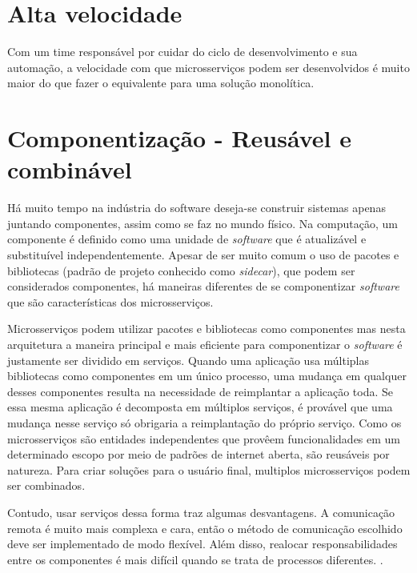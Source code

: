 \section{Alta velocidade}

Com um time responsável por cuidar do ciclo de desenvolvimento e sua automação, a velocidade com que microsserviços podem ser desenvolvidos é muito maior do que fazer o equivalente para uma solução monolítica. \cite{Familiar2015}

\section{Componentização - Reusável e combinável}

Há muito tempo na indústria do software deseja-se construir sistemas apenas juntando componentes, assim como se faz no mundo físico. Na computação, um componente é definido como uma unidade de \emph{software} que é atualizável e substituível independentemente. Apesar de ser muito comum o uso de pacotes e bibliotecas (padrão de projeto conhecido como \emph{sidecar}), que podem ser considerados componentes, há maneiras diferentes de se componentizar \emph{software} que são características dos microsserviços. \cite{MartinFowlerMicroservices}

Microsserviços podem utilizar pacotes e bibliotecas como componentes mas nesta arquitetura a maneira principal e mais eficiente para componentizar o \emph{software} é justamente ser dividido em serviços. Quando uma aplicação usa múltiplas bibliotecas como componentes em um único processo, uma mudança em qualquer desses componentes resulta na necessidade de reimplantar a aplicação toda. Se essa mesma aplicação é decomposta em múltiplos serviços, é provável que uma mudança nesse serviço só obrigaria a reimplantação do próprio serviço. Como os microsserviços são entidades independentes que provêem funcionalidades em um determinado escopo por meio de padrões de internet aberta, são reusáveis por natureza. Para criar soluções para o usuário final, multiplos microsserviços podem ser combinados. \cite{MartinFowlerMicroservices,Familiar2015}

Contudo, usar serviços dessa forma traz algumas desvantagens. A comunicação remota é muito mais complexa e cara, então o método de comunicação escolhido deve ser implementado de modo flexível. Além disso, realocar responsabilidades entre os componentes é mais difícil quando se trata de processos diferentes. \cite{MartinFowlerMicroservices}.

